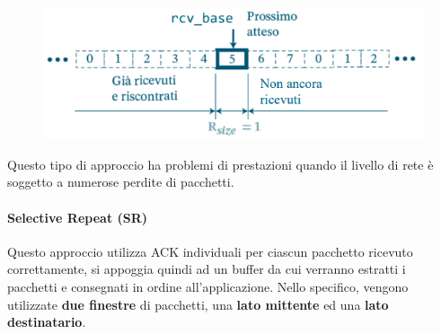 \documentclass{article}
\begin{document}
\begin{enumerate}
\begin{enumerate}
\begin{figure}[htbp]
            \center
            \includegraphics[scale=0.6]{img/GBN_destinatario.png}
        \end{figure}
    \end{enumerate}
\end{enumerate}

Questo tipo di approccio ha problemi di prestazioni quando il livello di rete è soggetto a numerose perdite di pacchetti.

\newpage

\paragraph{Selective Repeat (SR)} Questo approccio utilizza ACK individuali per ciascun pacchetto ricevuto correttamente, si appoggia quindi ad un buffer da cui verranno estratti i pacchetti e consegnati in ordine all'applicazione.
Nello specifico, vengono utilizzate \textbf{due finestre} di pacchetti, una \textbf{lato mittente} ed una \textbf{lato destinatario}.
\end{document}
